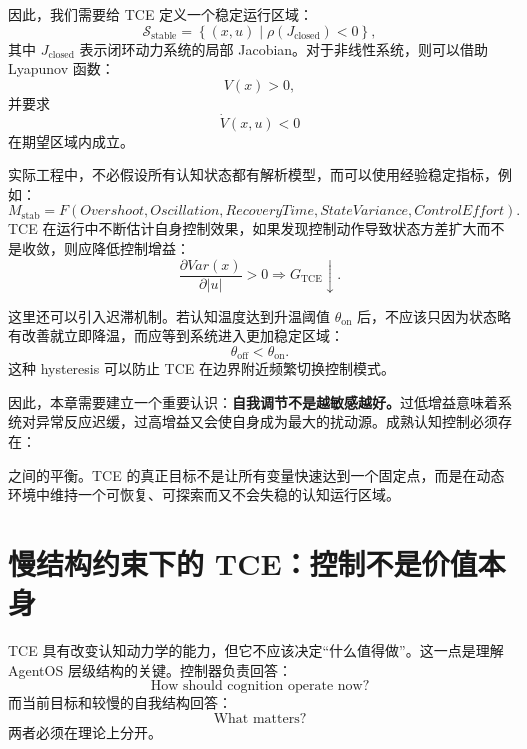 因此，我们需要给 TCE 定义一个稳定运行区域：
\begin{equation}
    \mathcal S_{\mathrm{stable}}
    =
    \left\{
    (x,u)
    \mid
    \rho(J_{\mathrm{closed}})
    <0
    \right\},
\end{equation}
其中 $J_{\mathrm{closed}}$ 表示闭环动力系统的局部 Jacobian。对于非线性系统，则可以借助 Lyapunov 函数：
\begin{equation}
    V(x)>0,
\end{equation}
并要求
\begin{equation}
    \dot V(x,u)<0
\end{equation}
在期望区域内成立。

实际工程中，不必假设所有认知状态都有解析模型，而可以使用经验稳定指标，例如：
\begin{equation}
    M_{\mathrm{stab}}
    =
    F(
    Overshoot,
    Oscillation,
    RecoveryTime,
    StateVariance,
    ControlEffort
    ).
\end{equation}
TCE 在运行中不断估计自身控制效果，如果发现控制动作导致状态方差扩大而不是收敛，则应降低控制增益：
\begin{equation}
    \frac{\partial Var(x)}{\partial |u|}
    >0
    \Rightarrow
    G_{\mathrm{TCE}}\downarrow.
\end{equation}

这里还可以引入迟滞机制。若认知温度达到升温阈值 $\theta_{\mathrm{on}}$ 后，不应该只因为状态略有改善就立即降温，而应等到系统进入更加稳定区域：
\begin{equation}
    \theta_{\mathrm{off}}
    <
    \theta_{\mathrm{on}}.
\end{equation}
这种 hysteresis 可以防止 TCE 在边界附近频繁切换控制模式。

因此，本章需要建立一个重要认识：\textbf{自我调节不是越敏感越好。}过低增益意味着系统对异常反应迟缓，过高增益又会使自身成为最大的扰动源。成熟认知控制必须存在：
\begin{statementbox}
\centering
{}
\end{statementbox}
之间的平衡。TCE 的真正目标不是让所有变量快速达到一个固定点，而是在动态环境中维持一个可恢复、可探索而又不会失稳的认知运行区域。

\section{慢结构约束下的 TCE：控制不是价值本身}

TCE 具有改变认知动力学的能力，但它不应该决定“什么值得做”。这一点是理解 AgentOS 层级结构的关键。控制器负责回答：
\begin{equation}
    \text{How should cognition operate now?}
\end{equation}
而当前目标和较慢的自我结构回答：
\begin{equation}
    \text{What matters?}
\end{equation}
两者必须在理论上分开。

